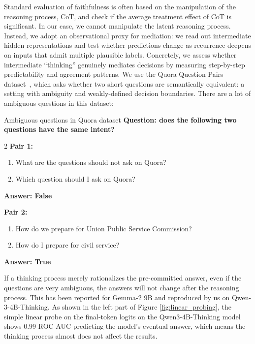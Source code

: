 \documentclass[]{bytedance_seed}
\newcommand{\1}{\mathbf{1}}
\begin{document}
{Standard evaluation of faithfulness is often based on the manipulation of the reasoning process, CoT, and check if the average treatment effect of CoT is significant. In our case, we cannot manipulate the latent reasoning process. Instead, we adopt an observational proxy for mediation: we read out intermediate hidden representations and test whether predictions change as recurrence deepens on inputs that admit multiple plausible labels. Concretely, we assess whether intermediate ``thinking'' genuinely mediates decisions by measuring step-by-step predictability and agreement patterns. We use the Quora Question Pairs dataset~\citep{quora_question_pairs_kaggle}, which asks whether two short questions are semantically equivalent: a setting with ambiguity and weakly-defined decision boundaries. There are a lot of ambiguous questions in this dataset:
\begin{theobox*}{Ambiguous questions in Quora dataset}
\small
\vspace{0.05cm}
\textbf{Question: does the following two questions have the same intent?}
\footnotesize{
\vspace{-0.23cm}
    \begin{multicols}{2}
        \colorbox{seedblue!20}{\textbf{Pair 1:}}
        \begin{enumerate}[leftmargin=12pt]
          \item What are the questions should not ask on Quora?
          \item Which question should I ask on Quora?
        \end{enumerate}
        \colorbox{red!12}{\textbf{Answer: False}}
        \columnbreak
        
        \hspace{-10pt}
        \colorbox{seedblue!20}{\textbf{Pair 2:}}
        \begin{enumerate}[leftmargin=5pt]
          \item How do we prepare for Union Public Service Commission?
          \item How do I prepare for civil service?
        \end{enumerate}
        \hspace{-10pt}
        \colorbox{blue!12}{\textbf{Answer: True}}
    \end{multicols}}
\end{theobox*}

If a thinking process merely rationalizes the pre-committed answer, even if the questions are very ambiguous, the answers will not change after the reasoning process. This has been reported for Gemma-2 9B and reproduced by us on Qwen-3-4B-Thinking. As shown in the left part of Figure \ref{fig:linear_probing}, the simple linear probe on the final-token logits on the Qwen3-4B-Thinking model shows 0.99 ROC AUC predicting the model's eventual answer, which means the thinking process almost does not affect the results.

}
\end{document}

